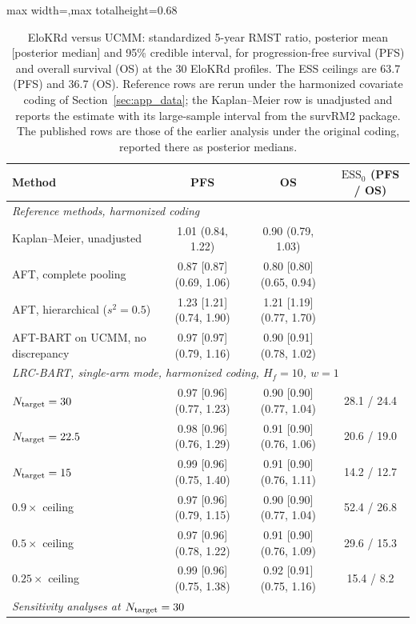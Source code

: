 \begin{table}[htbp]
\centering
\singlespacing
\caption{EloKRd versus UCMM: standardized 5-year RMST ratio, posterior mean [posterior median] and 95\% credible interval, for progression-free survival (PFS) and overall survival (OS) at the 30 EloKRd profiles. The ESS ceilings are 63.7 (PFS) and 36.7 (OS). Reference rows are rerun under the harmonized covariate coding of Section~\ref{sec:app_data}; the Kaplan--Meier row is unadjusted and reports the estimate with its large-sample interval from the survRM2 package. The published rows are those of the earlier analysis under the original coding, reported there as posterior medians.}
\label{tab:app}
\small
\setlength{\tabcolsep}{5pt}
\renewcommand{\arraystretch}{1}
\begin{adjustbox}{max width=\textwidth,max totalheight=0.68\textheight}
\begin{tabular}{lccc}
\toprule
Method & PFS & OS & $\mathrm{ESS}_0$ (PFS / OS) \\
\midrule
\multicolumn{4}{l}{\textit{Reference methods, harmonized coding}} \\
Kaplan--Meier, unadjusted & 1.01 (0.84, 1.22) & 0.90 (0.79, 1.03) &  \\
AFT, complete pooling & 0.87 [0.87] (0.69, 1.06) & 0.80 [0.80] (0.65, 0.94) &  \\
AFT, hierarchical ($s^2=0.5$) & 1.23 [1.21] (0.74, 1.90) & 1.21 [1.19] (0.77, 1.70) &  \\
AFT-BART on UCMM, no discrepancy & 0.97 [0.97] (0.79, 1.16) & 0.90 [0.91] (0.78, 1.02) &  \\
\midrule
\multicolumn{4}{l}{\textit{LRC-BART, single-arm mode, harmonized coding, $H_f=10$, $w=1$}} \\
$N_{\rm target}=30$ & 0.97 [0.96] (0.77, 1.23) & 0.90 [0.90] (0.77, 1.04) & 28.1 / 24.4 \\
$N_{\rm target}=22.5$ & 0.98 [0.96] (0.76, 1.29) & 0.91 [0.90] (0.76, 1.06) & 20.6 / 19.0 \\
$N_{\rm target}=15$ & 0.99 [0.96] (0.75, 1.40) & 0.91 [0.90] (0.76, 1.11) & 14.2 / 12.7 \\
$0.9\times$ ceiling & 0.97 [0.96] (0.79, 1.15) & 0.90 [0.90] (0.77, 1.04) & 52.4 / 26.8 \\
$0.5\times$ ceiling & 0.97 [0.96] (0.78, 1.22) & 0.91 [0.90] (0.76, 1.09) & 29.6 / 15.3 \\
$0.25\times$ ceiling & 0.99 [0.96] (0.75, 1.38) & 0.92 [0.91] (0.75, 1.16) & 15.4 / 8.2 \\
\midrule
\multicolumn{4}{l}{\textit{Sensitivity analyses at $N_{\rm target}=30$}} \\

\end{tabular}
\end{adjustbox}
\end{table}

